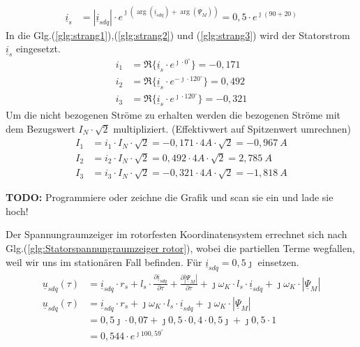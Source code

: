 \begin{solution}
\begin{compactenum}
\begin{align}
\underline{i}_{s} &= |\underline{i}_{sdq}| \cdot e^{\jmath (\arg(\underline{i}_{sdq}) + \arg(\underline{\Psi}_{M}))}= 0,5 \cdot e^{\jmath (90 + 20)}
\end{align}
In die Glg.(\ref{glg:strang1}),(\ref{glg:strang2}) und (\ref{glg:strang3}) wird der Statorstrom $\underline{i}_s$ eingesetzt.
\begin{align}
i_1 & = \Re \{ \underline{i}_s \cdot e^{\jmath \cdot 0 ^\circ} \} = -0,171\\
i_2 & = \Re \{ \underline{i}_s \cdot e^{-\jmath \cdot 120 ^\circ} \} = 0,492 \\
i_3 & = \Re \{ \underline{i}_s \cdot e^{\jmath \cdot 120 ^\circ} \}=  -0,321
\end{align}
Um die nicht bezogenen Ströme zu erhalten werden die bezogenen Ströme mit dem Bezugswert $I_N \cdot \sqrt{2}$ multipliziert. (Effektivwert auf Spitzenwert umrechnen)
\begin{align}
I_1 & = i_1 \cdot I_N \cdot \sqrt{2} = -0,171 \cdot 4 A \cdot \sqrt{2} =-0,967~A \\
I_2 & = i_2 \cdot I_N \cdot \sqrt{2} = 0,492 \cdot 4 A \cdot \sqrt{2} =2,785~A \\
I_3 & = i_3 \cdot I_N \cdot \sqrt{2} =-0,321 \cdot 4 A \cdot \sqrt{2} =-1,818~A
\end{align}
\item \textbf{TODO:} Programmiere oder zeichne die Grafik und scan sie ein und lade sie hoch!
\item Der Spannungraumzeiger im rotorfesten Koordinatensystem errechnet sich nach Glg.(\ref{glg:Statorspannungraumzeiger rotor}), wobei die partiellen Terme wegfallen, weil wir uns im stationären Fall befinden. Für $\underline{i}_{sdq}= 0,5 \jmath$ einsetzen.
\begin{align}
\underline{u}_{sdq}(\tau) &= \underline{i}_{sdq} \cdot r_s + l_s \cdot \frac{\partial \underline{i}_{sdq}}{\partial \tau} + \frac{\partial |\underline{\Psi}_M|}{\partial \tau} + \jmath \omega_K \cdot l_s \cdot \underline{i}_{sdq} + \jmath \omega_K \cdot |\underline{\Psi}_M|\\
\underline{u}_{sdq}(\tau) &= \underline{i}_{sdq} \cdot r_s + \jmath \omega_K \cdot l_s \cdot \underline{i}_{sdq} + \jmath \omega_K \cdot |\underline{\Psi}_M|\\
&= 0,5 \jmath \cdot 0,07 + \jmath 0,5 \cdot 0,4 \cdot 0,5 \jmath +\jmath 0,5 \cdot 1\\
&=0,544 \cdot e^{\jmath 100,59^\circ}
\end{align}
\end{compactenum}
\end{solution}